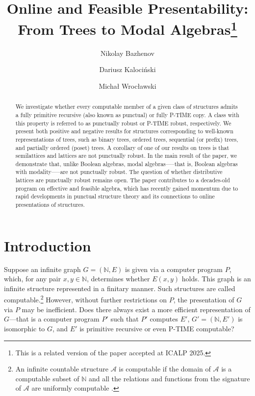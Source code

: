 \documentclass[a4paper,UKenglish,cleveref, autoref, thm-restate]{lipics-v2021}
\title{Online and Feasible Presentability: From Trees to Modal Algebras\footnote{This is a related version of the paper accepted at ICALP 2025.}}
\author{Nikolay Bazhenov}{Novosibirsk State University, Novosibirsk, Russia}{nickbazh@yandex.ru}{https://orcid.org/0000-0002-5834-2770}{The work of N.~Bazhenov is supported by the Mathematical Center in Akademgorodok under the agreement 
No.~075-15-2022-282 with the Ministry of Science and Higher Education of the Russian Federation.}
\author{Dariusz Kalociński}{Institute of Computer Science, Polish Academy of Sciences, Warsaw, Poland}{dariusz.kalocinski@gmail.com}{https://orcid.org/0000-0002-3044-525X}{The work of D. Kalociński is supported by the National Science Centre Poland under the agreement no. 2023/49/B/HS1/03930.}
\author{Michał Wrocławski}{Faculty of Philosophy, University of Warsaw, Poland}{m.wroclawski@uw.edu.pl}{https://orcid.org/0000-0003-2679-7321}{}
\begin{document}
\maketitle

\begin{abstract}

We investigate whether every computable member of a given class of structures admits a fully primitive recursive (also known as punctual) or fully P-TIME copy. A class with this property is referred to as punctually robust or P-TIME robust, respectively. We present both positive and negative results for structures corresponding to well-known representations of trees, such as binary trees, ordered trees, sequential (or prefix) trees, and partially ordered (poset) trees. A corollary of one of our results on trees is that semilattices and lattices are not punctually robust. In the main result of the paper, we demonstrate that, unlike Boolean algebras, modal algebras—--that is, Boolean algebras with modality—--are not punctually robust. The question of whether distributive lattices are punctually robust remains open. The paper contributes to a decades-old program on effective and feasible algebra, which has recently gained momentum due to rapid developments in punctual structure theory and its connections to online presentations of structures.  
\end{abstract}


\section{Introduction}

Suppose an infinite graph \( G = (\mathbb{N}, E) \) is given via a computer program \( P \), which, for any pair \( x, y \in \mathbb{N} \), determines whether \( E(x, y) \) holds. This graph is an infinite structure represented in a finitary manner. Such structures are called computable.\footnote{An infinite countable structure $\mathcal A$ is computable if the domain of $\mathcal A$ is a computable subset of $\mathbb N$ and all the relations and functions from the signature of $\mathcal A$ are uniformly computable \cite{ash_computable_2000}.} However, without further restrictions on \( P \), the presentation of \( G \) via $P$ may be inefficient. Does there always exist a more efficient representation of $G$---that is a computer program \( P' \) such that \( P' \) computes \( E' \), \( G' = (\mathbb{N}, E') \) is isomorphic to \( G \), and \( E' \) is primitive recursive or even P-TIME computable?
\end{document}
